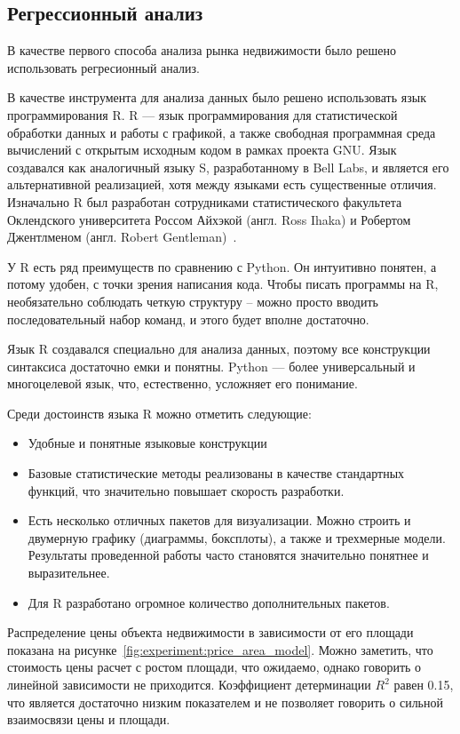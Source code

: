 
\subsection{Регрессионный анализ}
\label{sec:experiment:regression}


В качестве первого способа анализа рынка недвижимости было решено использовать регресионный анализ.

В качестве инструмента для анализа данных было решено использовать язык программирования R. R — язык программирования
для статистической обработки данных и работы с графикой, а также свободная программная среда вычислений с открытым
исходным кодом в рамках проекта GNU. Язык создавался как аналогичный языку S, разработанному в Bell Labs, и является
его альтернативной реализацией, хотя между языками есть существенные отличия. Изначально R был разработан сотрудниками статистического факультета Оклендского университета
Россом Айхэкой (англ. Ross Ihaka) и Робертом Джентлменом (англ. Robert Gentleman)~\cite{r_lang}.

У R есть ряд преимуществ по сравнению с Python. Он интуитивно понятен, а потому удобен,
с точки зрения написания кода. Чтобы писать программы на R, необязательно соблюдать четкую структуру – можно просто
вводить последовательный набор команд, и этого будет вполне достаточно.

Язык R создавался специально для анализа данных, поэтому все конструкции синтаксиса достаточно емки и понятны.
Python — более универсальный и многоцелевой язык, что, естественно, усложняет его понимание.

Среди достоинств языка R можно отметить следующие:
\begin{itemize}
  \item Удобные и понятные языковые конструкции
  \item Базовые статистические методы реализованы в качестве стандартных функций, что значительно повышает скорость разработки.
  \item Есть несколько отличных пакетов для визуализации. Можно строить и двумерную графику (диаграммы, боксплоты), а также и трехмерные модели. Результаты проведенной работы часто становятся значительно понятнее и выразительнее.
  \item Для R разработано огромное количество дополнительных пакетов.
\end{itemize}

Распределение цены объекта недвижимости в зависимости от его площади показана на рисунке~\ref{fig:experiment:price_area_model}.
Можно заметить, что стоимость цены расчет с ростом площади, что ожидаемо, однако говорить о линейной зависимости не приходится.
Коэффициент детерминации $R^2$ равен 0.15, что является достаточно низким показателем и не позволяет говорить о сильной
взаимосвязи цены и площади.

